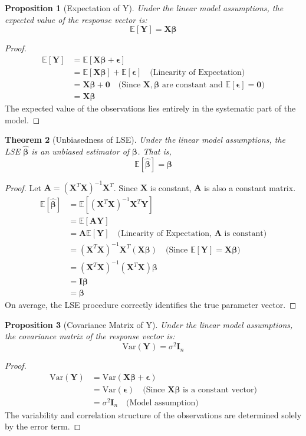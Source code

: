 \documentclass[11pt, letterpaper]{article}
\newtheorem{theorem}{Theorem}[section]
\newtheorem{proposition}[theorem]{Proposition}
\theoremstyle{definition}
\newcommand{\E}{\mathbb{E}}
\newcommand{\Var}{\text{Var}}
\newcommand{\mat}[1]{\mathbf{#1}} %
\newcommand{\vect}[1]{\boldsymbol{#1}} %
\newcommand{\T}{^T} %
\begin{document}
\begin{proposition}[Expectation of Y]
Under the linear model assumptions, the expected value of the response vector is:
\[ \E[\vect{Y}] = \mat{X}\vect{\beta} \]
\end{proposition}
\begin{proof}
\begin{align*}
\E[\vect{Y}] &= \E[\mat{X}\vect{\beta} + \vect{\epsilon}] \\
&= \E[\mat{X}\vect{\beta}] + \E[\vect{\epsilon}] \quad \text{(Linearity of Expectation)} \\
&= \mat{X}\vect{\beta} + \vect{0} \quad \text{(Since } \mat{X}, \vect{\beta} \text{ are constant and } \E[\vect{\epsilon}] = \vect{0}) \\
&= \mat{X}\vect{\beta}
\end{align*}
The expected value of the observations lies entirely in the systematic part of the model.
\end{proof}

\begin{theorem}[Unbiasedness of LSE]
Under the linear model assumptions, the LSE $\hat{\vect{\beta}}$ is an unbiased estimator of $\vect{\beta}$. That is,
\[ \E[\hat{\vect{\beta}}] = \vect{\beta} \]
\end{theorem}
\begin{proof}
Let $\mat{A} = (\mat{X}\T \mat{X})^{-1} \mat{X}\T$. Since $\mat{X}$ is constant, $\mat{A}$ is also a constant matrix.
\begin{align*}
\E[\hat{\vect{\beta}}] &= \E[(\mat{X}\T \mat{X})^{-1} \mat{X}\T \vect{Y}] \\
&= \E[\mat{A} \vect{Y}] \\
&= \mat{A} \E[\vect{Y}] \quad \text{(Linearity of Expectation, } \mat{A} \text{ is constant)} \\
&= (\mat{X}\T \mat{X})^{-1} \mat{X}\T (\mat{X}\vect{\beta}) \quad \text{(Since } \E[\vect{Y}] = \mat{X}\vect{\beta}) \\
&= (\mat{X}\T \mat{X})^{-1} (\mat{X}\T \mat{X}) \vect{\beta} \\
&= \mat{I} \vect{\beta} \\
&= \vect{\beta}
\end{align*}
On average, the LSE procedure correctly identifies the true parameter vector.
\end{proof}

\begin{proposition}[Covariance Matrix of Y]
Under the linear model assumptions, the covariance matrix of the response vector is:
\[ \Var(\vect{Y}) = \sigma^2 \mat{I}_n \]
\end{proposition}
\begin{proof}
\begin{align*}
\Var(\vect{Y}) &= \Var(\mat{X}\vect{\beta} + \vect{\epsilon}) \\
&= \Var(\vect{\epsilon}) \quad \text{(Since } \mat{X}\vect{\beta} \text{ is a constant vector)} \\
&= \sigma^2 \mat{I}_n \quad \text{(Model assumption)}
\end{align*}
The variability and correlation structure of the observations are determined solely by the error term.
\end{proof}
\end{document}
